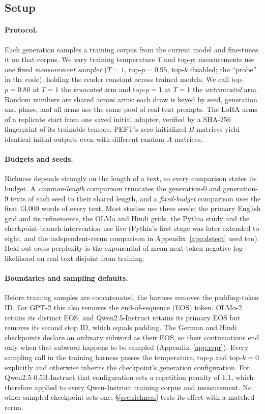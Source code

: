 \documentclass[10pt]{article}
\theoremstyle{plain}
\theoremstyle{definition}
\begin{document}
\subsection{Setup}
\label{sec:setup}

\paragraph{Protocol.} Each generation samples a training corpus from the current model and
fine-tunes it on that corpus. We vary training temperature $T$ and top-$p$; measurements use
one fixed \emph{measurement sampler} ($T=1$, top-$p=0.95$, top-$k$ disabled; the ``probe''
in the code), holding the reader constant across trained models.
We call top-$p=0.80$ at $T=1$ the \emph{truncated} arm and top-$p=1$ at $T=1$ the
\emph{untruncated} arm. Random numbers are shared across arms: each draw is keyed by seed,
generation and phase, and all arms use the same pool of real-text prompts. The LoRA \citep{hu2022lora}
arms of a replicate start from one saved initial adapter, verified by a SHA-256
fingerprint of its trainable tensors. PEFT's zero-initialized $B$ matrices
\citep{mangrulkar2022peft} yield identical initial outputs even with different random $A$ matrices.

\paragraph{Budgets and seeds.} Richness depends strongly on the length of a text, so every
comparison states its budget. A \emph{common-length} comparison truncates the generation-0 and
generation-9 texts of each seed to their shared length, and a \emph{fixed-budget} comparison
uses the first 13,000 words of every text. Most studies use three seeds; the primary English grid and its refinements, the OLMo and Hindi grids, the
Pythia study and the checkpoint-branch intervention use five (Pythia's first stage was later extended to
eight, and the independent-rerun comparison in Appendix~\ref{app:detect} used ten). Held-out cross-perplexity is the exponential of mean next-token negative log
likelihood on real text disjoint from training.

\paragraph{Boundaries and sampling defaults.} Before training samples are concatenated, the
harness removes the padding-token ID. For GPT-2 this also removes the end-of-sequence (EOS)
token. OLMo-2 retains its distinct EOS, and Qwen2.5-Instruct retains its primary EOS but removes
its second stop ID, which equals padding. The German and Hindi checkpoints declare an ordinary subword as their EOS,
so their continuations end only when that subword happens to be sampled
(Appendix~\ref{app:repr}). Every sampling call in the training harness passes the temperature,
top-$p$ and top-$k=0$ explicitly and otherwise inherits the checkpoint's generation configuration. For
Qwen2.5-0.5B-Instruct that configuration sets a repetition penalty of 1.1, which therefore
applied to every Qwen-Instruct training corpus and measurement. No other sampled checkpoint sets one;
\S\ref{sec:richness} tests its effect with a matched rerun.
\end{document}
